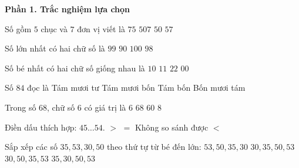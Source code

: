 \textbf{Phần 1. Trắc nghiệm lựa chọn}

\begin{ex} %
Số gồm $5$ chục và $7$ đơn vị viết là
\choice
{$75$}
{$507$}
{$50$}
{\True $57$}
\end{ex}

\begin{ex} %
Số lớn nhất có hai chữ số là
\choice
{\True $99$}
{$90$}
{$100$}
{$98$}
\end{ex}

\begin{ex} %
Số bé nhất có hai chữ số giống nhau là
\choice
{$10$}
{\True $11$}
{$22$}
{$00$}
\end{ex}

\begin{ex} %
Số $84$ đọc là
\choice
{\True Tám mươi tư}
{Tám mươi bốn}
{Tám bốn}
{Bốn mươi tám}
\end{ex}

\begin{ex} %
Trong số $68$, chữ số 6 có giá trị là
\choice
{$6$}
{$68$}
{\True $60$}
{$8$}
\end{ex}

\begin{ex} %
Điền dấu thích hợp: $45 \dots 54$.
\choice
{$>$}
{$=$}
{Không so sánh được}
{\True $<$}
\end{ex}

\begin{ex} %
Sắp xếp các số $35, 53, 30, 50$ theo thứ tự từ bé đến lớn:
\choice
{$53, 50, 35, 30$}
{\True $30, 35, 50, 53$}
{$30, 50, 35, 53$}
{$35, 30, 50, 53$}
\end{ex}

